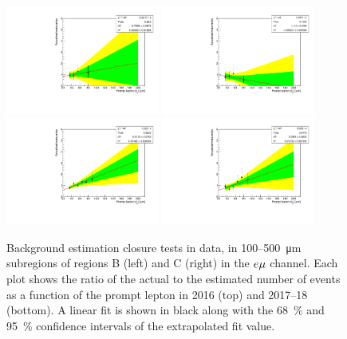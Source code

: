 \begin{figure}
\centering
\includegraphics[width=0.45\textwidth]{figures/bg/emu_data_2016_displacedElectron_ratiosVsPromptD0.pdf}
\includegraphics[width=0.45\textwidth]{figures/bg/emu_data_2016_displacedMuon_ratiosVsPromptD0.pdf}
\includegraphics[width=0.45\textwidth]{figures/bg/emu_data_2017_2018_displacedElectron_ratiosVsPromptD0.pdf}
\includegraphics[width=0.45\textwidth]{figures/bg/emu_data_2017_2018_displacedMuon_ratiosVsPromptD0.pdf}
\caption{Background estimation closure tests in data, in 100--\SI{500}{\um} subregions of regions B (left) and C (right) in the $e{\mu}$ channel. Each plot shows the ratio of the actual to the estimated number of events as a function of the prompt lepton \ad in 2016 (top) and 2017--18 (bottom). A linear fit is shown in black along with the \SI{68}{\percent} and \SI{95}{\percent} confidence intervals of the extrapolated fit value.}
\label{100to500um_fits_emu}
\end{figure}



